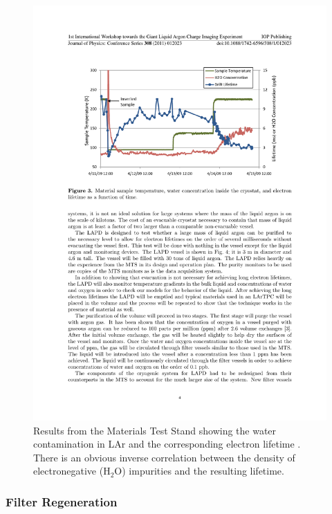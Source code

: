 \begin{figure}
  \centering
  \includegraphics[width=12cm]{MTSResults.pdf}
  \caption[Results from the Materials Test Stand showing the water contamination in LAr and the corresponding electron lifetime.]{Results from the Materials Test Stand showing the water contamination in LAr and the corresponding electron lifetime \cite{MTS2009a}.  There is an obvious inverse correlation between the density of electronegative (H$_2$O) impurities and the resulting lifetime.}
  \label{fig:MTSResults}
\end{figure}

\subsubsection{Filter Regeneration}\label{sec:FilterRegeneration}


